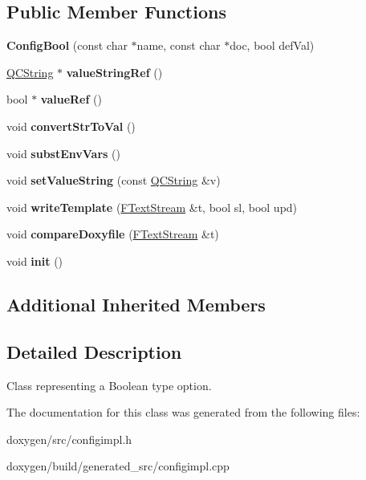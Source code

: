 \subsection*{Public Member Functions}
\begin{DoxyCompactItemize}
\item 
\mbox{\label{class_config_bool_a0250b41f09141944729a556c4d5f8146}} 
{\bfseries Config\+Bool} (const char $\ast$name, const char $\ast$doc, bool def\+Val)
\item 
\mbox{\label{class_config_bool_a71f105a81fcc98a2c11a807a51c67171}} 
\mbox{\hyperlink{class_q_c_string}{Q\+C\+String}} $\ast$ {\bfseries value\+String\+Ref} ()
\item 
\mbox{\label{class_config_bool_ab42eaac6320038f3ddeb73900e98d898}} 
bool $\ast$ {\bfseries value\+Ref} ()
\item 
\mbox{\label{class_config_bool_a5ebdef58b033f43ea09b1e5b0b44e330}} 
void {\bfseries convert\+Str\+To\+Val} ()
\item 
\mbox{\label{class_config_bool_af9c3c0887533842db8cf9201a5b63486}} 
void {\bfseries subst\+Env\+Vars} ()
\item 
\mbox{\label{class_config_bool_acfabddfc8b65f1850cb7b1bdfcfb6ae1}} 
void {\bfseries set\+Value\+String} (const \mbox{\hyperlink{class_q_c_string}{Q\+C\+String}} \&v)
\item 
\mbox{\label{class_config_bool_aab61095cad30bfb2e184eb389d4d4472}} 
void {\bfseries write\+Template} (\mbox{\hyperlink{class_f_text_stream}{F\+Text\+Stream}} \&t, bool sl, bool upd)
\item 
\mbox{\label{class_config_bool_aae15e4f2984fc14a8c9b5d6e14e40778}} 
void {\bfseries compare\+Doxyfile} (\mbox{\hyperlink{class_f_text_stream}{F\+Text\+Stream}} \&t)
\item 
\mbox{\label{class_config_bool_a087fdcc229617e80faf798e90fe17439}} 
void {\bfseries init} ()
\end{DoxyCompactItemize}
\subsection*{Additional Inherited Members}


\subsection{Detailed Description}
Class representing a Boolean type option. 

The documentation for this class was generated from the following files\+:\begin{DoxyCompactItemize}
\item 
doxygen/src/configimpl.\+h\item 
doxygen/build/generated\+\_\+src/configimpl.\+cpp\end{DoxyCompactItemize}
